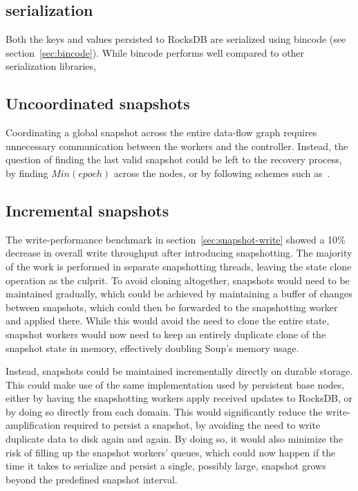 \subsection{ serialization}

Both the keys and values persisted to RocksDB are serialized using
bincode (see section~\ref{sec:bincode}). While bincode performs well
compared to other serialization libraries,

\subsection{Uncoordinated snapshots}

Coordinating a global snapshot across the entire data-flow graph requires
unnecessary communication between the workers and the controller. Instead, the
question of finding the last valid snapshot could be left to the recovery
process, \eg by finding $ Min(epoch) $ across the nodes, or by following schemes
such as~\cite{falkirk}.

\subsection{Incremental snapshots}

The write-performance benchmark in section~\ref{sec:snapshot-write} showed a
10\% decrease in overall write throughput after introducing snapshotting. The
majority of the work is performed in separate snapshotting threads, leaving the
state clone operation as the culprit. To avoid cloning altogether, snapshots
would need to be maintained gradually, which could be achieved by maintaining a
buffer of changes between snapshots, which could then be forwarded to the
snapshotting worker and applied there. While this would avoid the need to clone
the entire state, snapshot workers would now need to keep an entirely duplicate
clone of the snapshot state in memory, effectively doubling Soup's memory usage.

Instead, snapshots could be maintained incrementally directly on durable
storage. This could make use of the same  implementation
used by persistent base nodes, either by having the snapshotting workers apply
received updates to RocksDB, or by doing so directly from each domain. This
would significantly reduce the write-amplification required to persist a
snapshot, by avoiding the need to write duplicate data to disk again and again.
By doing so, it would also minimize the risk of filling up the snapshot workers'
queues, which could now happen if the time it takes to serialize and persist a
single, possibly large, snapshot grows beyond the predefined snapshot interval.
